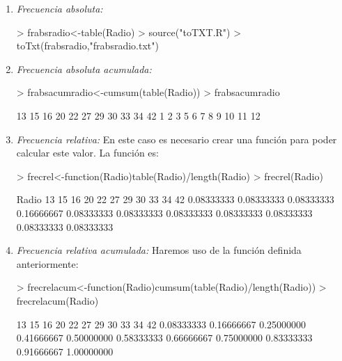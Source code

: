 \documentclass [a4paper] {article}
\begin{document}
\begin{enumerate}
\item
\textit{Frecuencia absoluta: }
\begin{Schunk}
\begin{Sinput}
> frabsradio<-table(Radio)
> source("toTXT.R")
> toTxt(frabsradio,"frabsradio.txt")
\end{Sinput}
\end{Schunk}


\item
\textit{Frecuencia absoluta acumulada: }
\begin{Schunk}
\begin{Sinput}
> frabsacumradio<-cumsum(table(Radio))
> frabsacumradio
\end{Sinput}
\begin{Soutput}
13 15 16 20 22 27 29 30 33 34 42 
 1  2  3  5  6  7  8  9 10 11 12 
\end{Soutput}
\end{Schunk}

\item
\textit{Frecuencia relativa: }En este caso es necesario crear una funci\'on
para poder calcular este valor. La funci\'on es:
\begin{Schunk}
\begin{Sinput}
> frecrel<-function(Radio){table(Radio)/length(Radio)}
> frecrel(Radio)
\end{Sinput}
\begin{Soutput}
Radio
        13         15         16         20         22         27         29         30         33         34         42 
0.08333333 0.08333333 0.08333333 0.16666667 0.08333333 0.08333333 0.08333333 0.08333333 0.08333333 0.08333333 0.08333333 
\end{Soutput}
\end{Schunk}

\item
\textit{Frecuencia relativa acumulada: }Haremos uso de la funci\'on definida anteriormente:
\begin{Schunk}
\begin{Sinput}
> frecrelacum<-function(Radio){cumsum(table(Radio)/length(Radio))}
> frecrelacum(Radio)
\end{Sinput}
\begin{Soutput}
        13         15         16         20         22         27         29         30         33         34         42 
0.08333333 0.16666667 0.25000000 0.41666667 0.50000000 0.58333333 0.66666667 0.75000000 0.83333333 0.91666667 1.00000000 
\end{Soutput}
\end{Schunk}
\end{enumerate}
\end{document}
